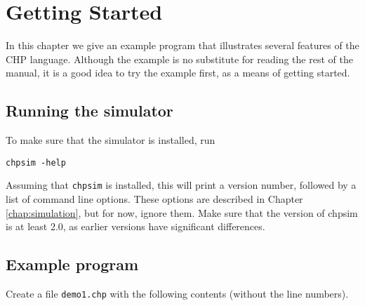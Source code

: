 %
%
%

\chapter{Getting Started}\label{chap:gettingstarted}

In this chapter we give an example program that illustrates several features
of the CHP language. Although the example is no substitute for reading
the rest of the manual, it is a good idea to try the example first,
as a means of getting started. 

\section{Running the simulator}\label{sec:runningstart}

To make sure that the simulator is installed, run
\begin{verbatim}
chpsim -help
\end{verbatim}
Assuming that {\tt{}chpsim} is installed, this will print a version number,
followed by a list of command line options.  These options are described in
Chapter \ref{chap:simulation}, but for now, ignore them.  Make sure that the
version of chpsim is at least 2.0, as earlier versions have significant
differences.



\section{Example program}\label{sec:demo1}

Create a file {\tt{}demo1.chp} with the following contents (without the line numbers).

